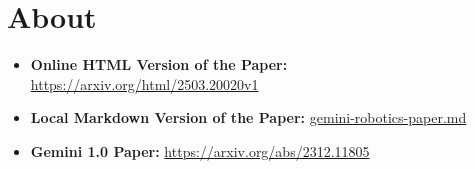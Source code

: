 \documentclass[12pt,a4paper]{article}
\begin{document}
\section{About}

\begin{itemize}
    \item \textbf{Online HTML Version of the Paper:} \url{https://arxiv.org/html/2503.20020v1}
    \item \textbf{Local Markdown Version of the Paper:} \href{../source-paper/gemini-robotics-paper.md}{gemini-robotics-paper.md}
    \item \textbf{Gemini 1.0 Paper:} \url{https://arxiv.org/abs/2312.11805}
\end{itemize}
\end{document}
